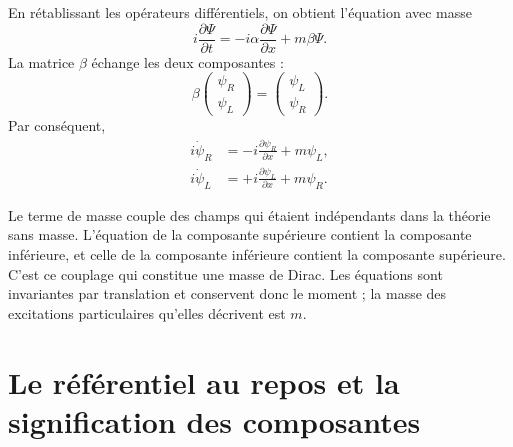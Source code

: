 En rétablissant les opérateurs différentiels, on obtient l’équation avec masse
\begin{equation}
i\frac{\partial\Psi}{\partial t}
=
-i\alpha\frac{\partial\Psi}{\partial x}
+m\beta\Psi.
\end{equation}
La matrice \(\beta\) échange les deux composantes :
\begin{equation}
\beta
\begin{pmatrix}
\psi_R\\
\psi_L
\end{pmatrix}
=
\begin{pmatrix}
\psi_L\\
\psi_R
\end{pmatrix}.
\end{equation}
Par conséquent,
\begin{align}
i\dot{\psi}_R
&=-i\frac{\partial\psi_R}{\partial x}+m\psi_L,\\
i\dot{\psi}_L
&=+i\frac{\partial\psi_L}{\partial x}+m\psi_R.
\end{align}

Le terme de masse couple des champs qui étaient indépendants dans la théorie sans masse. L’équation de la composante supérieure contient la composante inférieure, et celle de la composante inférieure contient la composante supérieure. C’est ce couplage qui constitue une masse de Dirac. Les équations sont invariantes par translation et conservent donc le moment ; la masse des excitations particulaires qu’elles décrivent est \(m\).

\begin{classroomqa}
\end{classroomqa}

\section{Le référentiel au repos et la signification des composantes}

